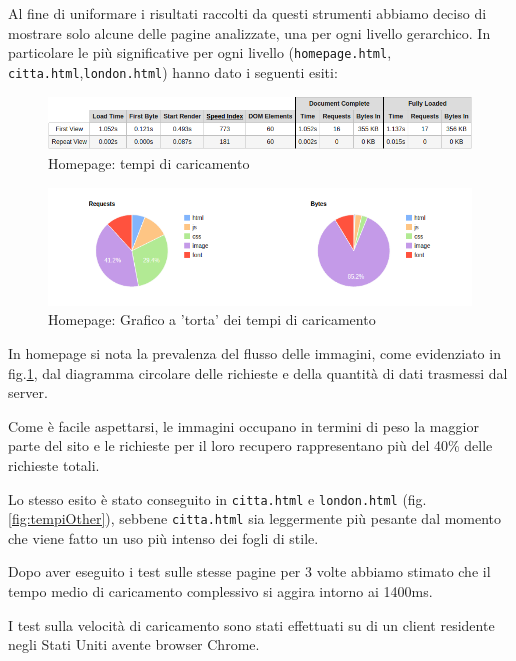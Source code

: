 Al fine di uniformare i risultati raccolti da questi strumenti abbiamo deciso
di mostrare solo alcune delle pagine analizzate, una per ogni livello
gerarchico.
In particolare le più significative per ogni livello (\texttt{homepage.html},
\texttt{citta.html},\texttt{london.html}) hanno dato i seguenti esiti:

\begin{figure}[h]
\includegraphics[width=\linewidth]{images/performance/webpagetest/home.png}
\caption{Homepage: tempi di caricamento}
\label{fig:tempiHome}
\end{figure}

\begin{figure}[h]
\includegraphics[width=\linewidth]{images/performance/webpagetest/home-graph.png}
\caption{Homepage: Grafico a 'torta' dei tempi di caricamento}
\end{figure}

In homepage si nota la prevalenza del flusso delle immagini, come evidenziato
in fig.\ref{fig:tempiHome}, dal diagramma circolare delle richieste e della
quantità di dati trasmessi dal server.

Come è facile aspettarsi, le immagini occupano in termini di peso la maggior
parte del sito e le richieste per il loro recupero rappresentano più del 40\%
delle richieste totali.


Lo stesso esito è stato conseguito in \texttt{citta.html} e
\texttt{london.html} (fig.\ref{fig:tempiOther}), sebbene \texttt{citta.html}
sia leggermente più pesante dal momento che viene fatto un uso più intenso dei
fogli di stile.

Dopo aver eseguito i test sulle stesse pagine per 3 volte abbiamo stimato che il tempo medio di caricamento complessivo si aggira intorno ai 1400ms.

I test sulla velocità di caricamento sono stati effettuati su di un client residente negli Stati Uniti avente browser Chrome.


